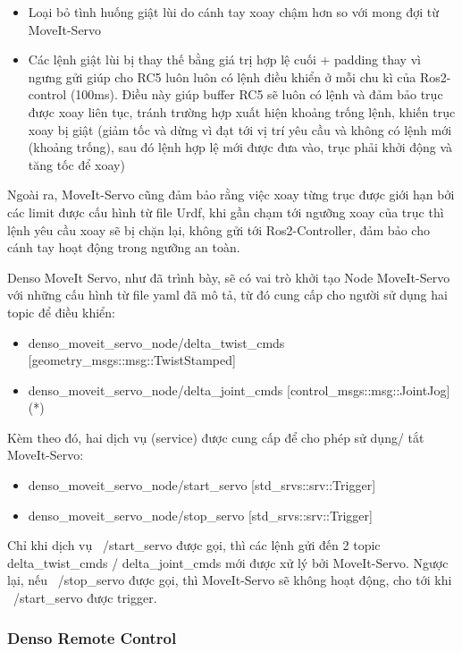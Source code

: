 \begin{itemize}
    \item Loại bỏ tình huống giật lùi do cánh tay xoay chậm hơn so với mong đợi từ MoveIt-Servo
    \item Các lệnh giật lùi bị thay thế bằng giá trị hợp lệ cuối + padding thay vì ngưng gửi giúp cho RC5 luôn luôn có lệnh điều khiển ở mỗi chu kì của Ros2-control (100ms). Điều này giúp buffer RC5 sẽ luôn có lệnh và đảm bảo trục được xoay liên tục, tránh trường hợp xuất hiện khoảng trống lệnh, khiến trục xoay bị giật (giảm tốc và dừng vì đạt tới vị trí yêu cầu và không có lệnh mới (khoảng trống), sau đó lệnh hợp lệ mới được đưa vào, trục phải khởi động và tăng tốc để xoay)
\end{itemize}

Ngoài ra, MoveIt-Servo cũng đảm bảo rằng việc xoay từng trục được giới hạn bởi các limit được cấu hình từ file Urdf, khi gần chạm tới ngưỡng xoay của trục thì lệnh yêu cầu xoay sẽ bị chặn lại, không gửi tới Ros2-Controller, đảm bảo cho cánh tay hoạt động trong ngưỡng an toàn. 

Denso MoveIt Servo, như đã trình bày, sẽ có vai trò khởi tạo Node MoveIt-Servo với những cấu hình từ file yaml đã mô tả, từ đó cung cấp cho người sử dụng hai topic để điều khiển:

\begin{itemize}
    \item denso\_moveit\_servo\_node/delta\_twist\_cmds [geometry\_msgs::msg::TwistStamped]
    \item denso\_moveit\_servo\_node/delta\_joint\_cmds [control\_msgs::msg::JointJog] (*)
\end{itemize}

Kèm theo đó, hai dịch vụ (service) được cung cấp để cho phép sử dụng/ tắt MoveIt-Servo:

\begin{itemize}
    \item denso\_moveit\_servo\_node/start\_servo [std\_srvs::srv::Trigger]
    \item denso\_moveit\_servo\_node/stop\_servo [std\_srvs::srv::Trigger]
\end{itemize}

Chỉ khi dịch vụ ~/start\_servo được gọi, thì các lệnh gửi đến 2 topic delta\_twist\_cmds / delta\_joint\_cmds mới được xử lý bởi MoveIt-Servo. Ngược lại, nếu ~/stop\_servo được gọi, thì MoveIt-Servo sẽ không hoạt động, cho tới khi ~/start\_servo được trigger.

\subsubsection{Denso Remote Control}

